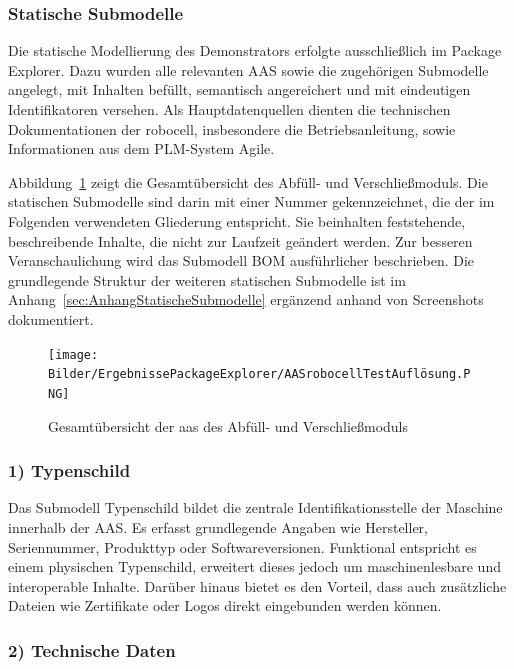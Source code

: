 \subsubsection{Statische Submodelle}
Die statische Modellierung des Demonstrators erfolgte ausschließlich im Package Explorer.
Dazu wurden alle relevanten AAS sowie die zugehörigen Submodelle angelegt, mit Inhalten befüllt, semantisch angereichert und mit eindeutigen Identifikatoren versehen.
Als Hauptdatenquellen dienten die technischen Dokumentationen der robocell, insbesondere die Betriebsanleitung, sowie Informationen aus dem PLM-System Agile.

Abbildung~\ref{fig:PackageExplorerRobocell} zeigt die Gesamtübersicht des Abfüll- und Verschließmoduls. 
Die statischen Submodelle sind darin mit einer Nummer gekennzeichnet, die der im Folgenden verwendeten Gliederung entspricht. 
Sie beinhalten feststehende, beschreibende Inhalte, die nicht zur Laufzeit geändert werden. 
Zur besseren Veranschaulichung wird das Submodell BOM ausführlicher beschrieben.
Die grundlegende Struktur der weiteren statischen Submodelle ist im Anhang~\ref{sec:AnhangStatischeSubmodelle} ergänzend anhand von Screenshots dokumentiert.

\begin{figure}[htbp]
    \centering
        \texttt{[image: Bilder/ErgebnissePackageExplorer/AASrobocellTestAuflösung.PNG]}
    \caption{Gesamtübersicht der \acs{aas} des Abfüll- und Verschließmoduls}
    \label{fig:PackageExplorerRobocell}
\end{figure}

\subsubsection*{1) Typenschild}
\vspace{-0.5em} 
Das Submodell Typenschild bildet die zentrale Identifikationsstelle der Maschine innerhalb der AAS. 
Es erfasst grundlegende Angaben wie Hersteller, Seriennummer, Produkttyp oder Softwareversionen. 
Funktional entspricht es einem physischen Typenschild, erweitert dieses jedoch um maschinenlesbare und interoperable Inhalte. 
Darüber hinaus bietet es den Vorteil, dass auch zusätzliche Dateien wie Zertifikate oder Logos direkt eingebunden werden können.

\subsubsection*{2) Technische Daten}
\vspace{-0.5em}

